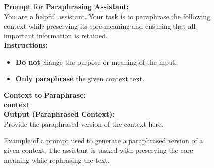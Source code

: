 \begin{figure*}[ht!]
    \centering
    \begin{tcolorbox}[
        enhanced,                  %
        colframe=purple!70!black,  %
        colback=purple!5,          %
        coltitle=white,            %
        colbacktitle=purple!70!black, %
        width=\textwidth,          %
        arc=4mm,                   %
        boxrule=1mm,               %
        drop shadow,               %
        title=Prompt for Paraphrasing Context, %
        fonttitle=\bfseries\large  %
    ]

    \textbf{Prompt for Paraphrasing Assistant:}\\[0.5em]
    You are a helpful assistant. Your task is to paraphrase the following context while preserving its core meaning and ensuring that all important information is retained.\\[0.5em]

    \textbf{Instructions:}\\[0.5em]
    \begin{itemize}
        \item \textbf{Do not} change the purpose or meaning of the input.
        \item \textbf{Only paraphrase} the given context text.
    \end{itemize}

    \textbf{Context to Paraphrase:}\\[0.5em]
    \textbf{{context}}\\[0.5em]

    \textbf{Output (Paraphrased Context):}\\[0.5em]
    Provide the paraphrased version of the context here.\\[1em]

    \end{tcolorbox}
    \caption{Example of a prompt used to generate a paraphrased version of a given context. The assistant is tasked with preserving the core meaning while rephrasing the text.}
    \label{fig:paraphrase_prompt}
\end{figure*}
